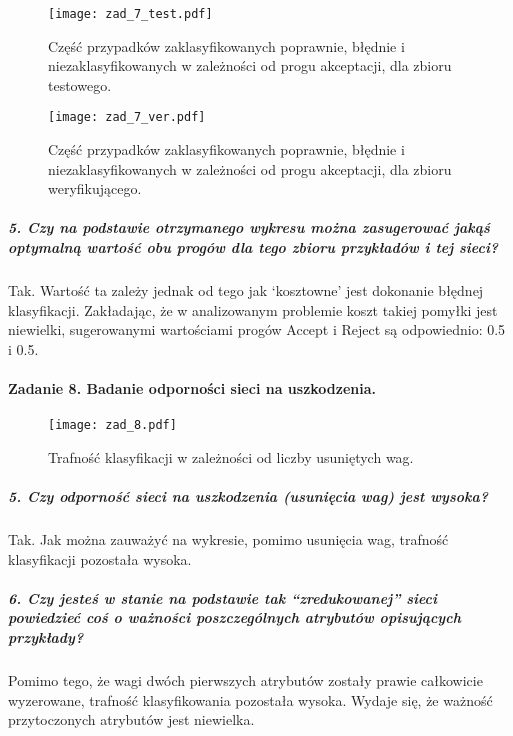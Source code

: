 \documentclass{article}
\begin{document}
\begin{figure}[H]
\begin{center}
\texttt{[image: zad\_7\_test.pdf]}
\end{center}
\caption{Część przypadków zaklasyfikowanych poprawnie, błędnie i niezaklasyfikowanych w zależności od progu akceptacji, dla zbioru testowego.}
\label{fig-1Tdelta}
\end{figure}

\begin{figure}[H]
\begin{center}
\texttt{[image: zad\_7\_ver.pdf]}
\end{center}
\caption{Część przypadków zaklasyfikowanych poprawnie, błędnie i niezaklasyfikowanych w zależności od progu akceptacji, dla zbioru weryfikującego.}
\label{fig-1Tdelta}
\end{figure}

\subparagraph{5. Czy na podstawie otrzymanego wykresu można zasugerować jakąś optymalną wartość obu progów dla tego zbioru przykładów i tej sieci?}

Tak. Wartość ta zależy jednak od tego jak `kosztowne' jest dokonanie błędnej klasyfikacji. Zakładając, że w analizowanym problemie koszt takiej pomyłki jest niewielki, sugerowanymi wartościami progów Accept i Reject są odpowiednio: 0.5 i 0.5.

\paragraph{Zadanie 8. Badanie odporności sieci na uszkodzenia.}

\begin{figure}[H]
\begin{center}
\texttt{[image: zad\_8.pdf]}
\end{center}
\caption{Trafność klasyfikacji w zależności od liczby usuniętych wag.}
\label{fig-1Tdelta}
\end{figure}

\subparagraph{5. Czy odporność sieci na uszkodzenia (usunięcia wag) jest wysoka?}
Tak. Jak można zauważyć na wykresie, pomimo usunięcia wag, trafność klasyfikacji pozostała wysoka.
\subparagraph{6. Czy jesteś w stanie na podstawie tak “zredukowanej” sieci powiedzieć coś o ważności poszczególnych atrybutów opisujących przykłady?}
Pomimo tego, że wagi dwóch pierwszych atrybutów zostały prawie całkowicie wyzerowane, trafność klasyfikowania pozostała wysoka. Wydaje się, że ważność przytoczonych atrybutów jest niewielka. 
\end{document}
